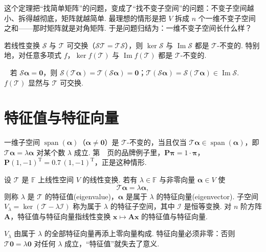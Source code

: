 \documentclass[lang=cn,10.5pt,scheme=chinese,toc=twocol,section,chinesefont=nofont,
twoside,citestyle=gb7714-2015,bibstyle=gb7714-2015]{elegantbook}
\DeclareRobustCommand{\textbf}[1]{{\lnsemiboldlatin\lnsemiboldcjk #1}}
\newcommand{\vv}[1]{\boldsymbol{#1}}
\newcommand{\zero}{\boldsymbol{0}}          %
\newcommand{\trans}{\mathrm{T}}             %
\numberwithin{equation}{section}   %
\newcommand{\spn}{\operatorname{span}}      %
\newcommand{\imm}{\operatorname{Im}}        %
\newcommand*{\lnlabel}[1]{{\sffamily\bfseries\color{black}#1}}
\renewenvironment{proof}{%
	\par\noindent\lnlabel{\proofname}\;\ \color{black!90}\cfs}{\par}
\begin{document}
\begin{motivebox}
  这个定理把“找简单矩阵”的问题，变成了“找不变子空间”的问题：不变子空间越小、拆得越彻底，矩阵就越简单. 最理想的情形是把 $V$ 拆成 $n$ 个\textbf{一维}不变子空间之和——那时矩阵就是对角矩阵. 于是问题归结为：一维不变子空间长什么样？
\end{motivebox}

\begin{lemma}
  \label{lem:commuteinv}
  若线性变换 $\mathscr S$ 与 $\mathscr T$ 可交换（$\mathscr{ST}=\mathscr{TS}$），则 $\ker\mathscr S$ 与 $\imm\mathscr S$ 都是 $\mathscr T$-不变的. 特别地，对任意多项式 $f$，$\ker f(\mathscr T)$ 与 $\imm f(\mathscr T)$ 都是 $\mathscr T$-不变的.
\end{lemma}
\begin{proof}
  若 $\mathscr S\vv\alpha=\zero$，则 $\mathscr S(\mathscr T\vv\alpha)=\mathscr T(\mathscr S\vv\alpha)=\zero$；$\mathscr T(\mathscr S\vv\alpha)=\mathscr S(\mathscr T\vv\alpha)\in\imm\mathscr S$. $f(\mathscr T)$ 显然与 $\mathscr T$ 可交换.
\end{proof}

\section{特征值与特征向量}

一维子空间 $\spn(\vv\alpha)$（$\vv\alpha\ne\zero$）是 $\mathscr T$-不变的，当且仅当 $\mathscr T\vv\alpha\in\spn(\vv\alpha)$，即 $\mathscr T\vv\alpha=\lambda\vv\alpha$ 对某个数 $\lambda$ 成立. 第~\pageref{eq:markov2}~页的品牌例子里，$\vv P\vv\pi=1\cdot\vv\pi$，$\vv P(1,-1)^\trans=0.7\,(1,-1)^\trans$，正是这种情形.

\begin{definition}
  设 $\mathscr T$ 是 $\mathbb{F}$ 上线性空间 $V$ 的线性变换. 若有 $\lambda\in\mathbb{F}$ 与\textbf{非零}向量 $\vv\alpha\in V$ 使
  \[\mathscr T\vv\alpha=\lambda\vv\alpha,\]
  则称 $\lambda$ 是 $\mathscr T$ 的\textbf{特征值}(eigenvalue)，$\vv\alpha$ 是属于 $\lambda$ 的\textbf{特征向量}(eigenvector). 子空间 $V_\lambda=\ker(\mathscr T-\lambda\mathscr I)$ 称为属于 $\lambda$ 的\textbf{特征子空间}，其中 $\mathscr I$ 是恒等变换. 对 $n$ 阶方阵 $\vv A$，特征值与特征向量指线性变换 $\vv x\mapsto\vv{Ax}$ 的特征值与特征向量.
\end{definition}

$V_\lambda$ 由属于 $\lambda$ 的全部特征向量再添上零向量构成. 特征向量必须非零：否则 $\mathscr T\zero=\lambda\zero$ 对任何 $\lambda$ 成立，“特征值”就失去了意义.
\end{document}
